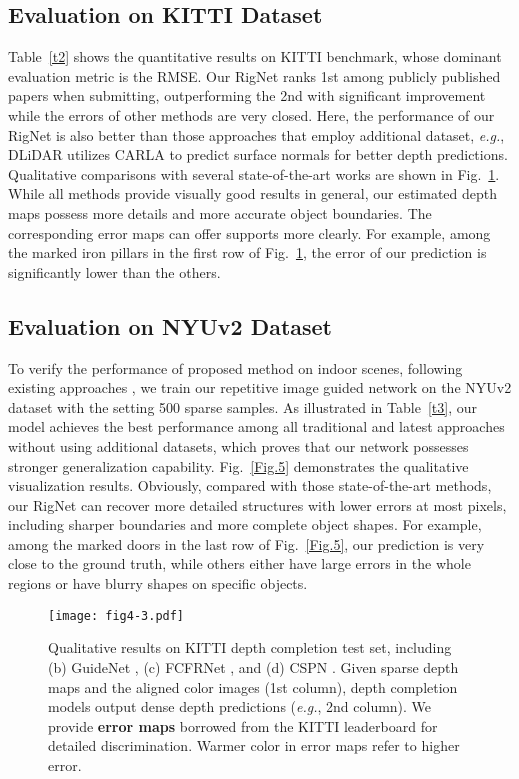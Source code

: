 \documentclass[runningheads]{llncs}
\begin{document}
\subsection{Evaluation on KITTI Dataset}
Table~\ref{t2} shows the quantitative results on KITTI benchmark, whose dominant evaluation metric is the RMSE. Our RigNet ranks 1st among publicly published papers when submitting, outperforming the 2nd with significant  improvement while the errors of other methods are very closed. Here, the performance of our RigNet is also better than those approaches that employ additional dataset, \emph{e.g.}, DLiDAR \cite{Qiu_2019_CVPR} utilizes CARLA \cite{dosovitskiy2017carla} to predict surface normals for better depth predictions. Qualitative comparisons with several state-of-the-art works are shown in Fig.~\ref{Fig.4}. While all methods provide visually good results in general, our estimated depth maps possess more details and more accurate object boundaries. The corresponding error maps can offer supports more clearly. For example, among the marked iron pillars in the first row of Fig.~\ref{Fig.4}, the error of our prediction is significantly lower than the others.

\subsection{Evaluation on NYUv2 Dataset}
To verify the performance of proposed method on indoor scenes, following existing approaches \cite{Cheng2020CSPN,park2020nonlocal,tang2020learning,liu2021fcfr}, we train our repetitive image guided network on the NYUv2 dataset \cite{silberman2012indoor} with the setting 500 sparse samples. As illustrated in Table~\ref{t3}, our model achieves the best performance among all traditional and latest approaches without using additional datasets, which proves that our network possesses stronger generalization capability. Fig.~\ref{Fig.5} demonstrates the qualitative visualization results. Obviously, compared with those state-of-the-art methods, our RigNet can recover more detailed structures with lower errors at most pixels, including sharper boundaries and more complete object shapes. For example, among the marked doors in the last row of Fig.~\ref{Fig.5}, our prediction is very close to the ground truth, while others either have large errors in the whole regions or have blurry shapes on specific objects.

\begin{figure}[t]
  \centering
  \texttt{[image: fig4-3.pdf]}\\
  \caption{Qualitative results on KITTI depth completion test set, including (b) GuideNet \cite{tang2020learning}, (c) FCFRNet \cite{liu2021fcfr}, and (d) CSPN \cite{2018Learning}. Given sparse depth maps and the aligned color images (1st column), depth completion models output dense depth predictions (\emph{e.g.}, 2nd column). We provide \textbf{error maps} borrowed from the KITTI leaderboard for detailed discrimination. Warmer color in error maps refer to higher error.}\label{Fig.4}
\end{figure}
\end{document}
